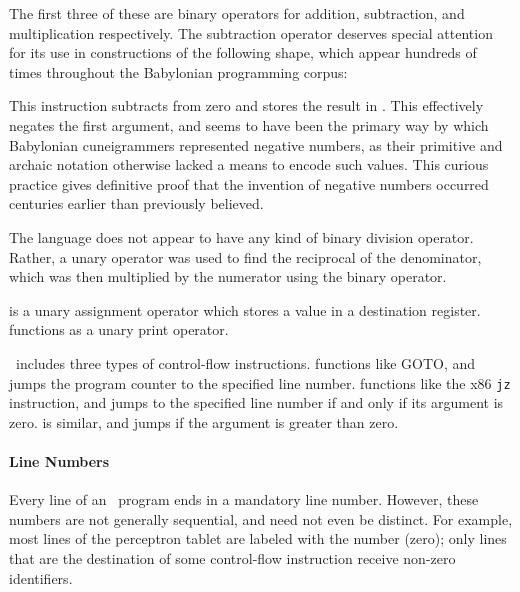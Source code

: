 \documentclass[11pt]{article}
\newcommand{\emeszida}{\textcuneiform{𒅴𒋃𒀀}}
\begin{document}
The first three of these are binary operators for addition, subtraction, and multiplication respectively. 
The subtraction operator deserves special attention for its use in constructions of the following shape, which appear hundreds of times throughout the Babylonian programming corpus:

\begin{center}
    \qquad{}\qquad{}\qquad{}
\end{center}

This instruction subtracts  from zero and stores the result in . 
This effectively negates the first argument, and seems to have been the primary way by which Babylonian cuneigrammers represented negative numbers, as their primitive and archaic notation otherwise lacked a means to encode such values.
This curious practice gives definitive proof that the invention of negative numbers occurred centuries earlier than previously believed.

The language does not appear to have any kind of binary division operator. Rather, a unary  operator was used to find the reciprocal of the denominator, which was then multiplied by the numerator using the binary  operator.

 is a unary assignment operator which stores a value in a destination register.  functions as a unary print operator.

\emeszida\ includes three types of control-flow instructions.  functions like GOTO, and jumps the program counter to the specified line number.  functions like the x86 \texttt{jz} instruction, and jumps to the specified line number if and only if its argument is zero.  is similar, and jumps if the argument is greater than zero.

\paragraph{Line Numbers}
Every line of an \emeszida\ program ends in a mandatory line number. 
However, these numbers are not generally sequential, and need not even be distinct. 
For example, most lines of the perceptron tablet are labeled with the number  (zero); only lines that are the destination of some control-flow instruction receive non-zero identifiers. 
\end{document}
